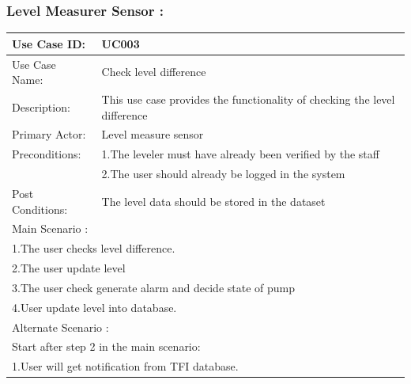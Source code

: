 	\subsubsection{Level Measurer Sensor :}
			\begin{center}
			\vspace*{1\baselineskip}	
			\begin{tabular}{|l|p{10cm}|}
				\hline
				Use Case ID: & UC003 \\
				\hline
				Use Case Name: & Check level difference \\
				\hline
				Description: & This use case provides the functionality of checking the level difference \\
				\hline
				Primary Actor: & Level measure sensor \\
				\hline
				Preconditions: & 1.The leveler must have already been verified by the staff\\ 
				& 2.The user should already be logged in the system \\
				\hline
				Post Conditions: & The level data should be stored in the dataset\\
				\hline
				\multicolumn{2}{|l|}{Main Scenario :} \\
				\hline
				\multicolumn{2}{|l|}{1.The user checks level difference.} \\
				\multicolumn{2}{|l|}{2.The user update level} \\
				\multicolumn{2}{|l|}{3.The user check generate alarm and decide state of pump} \\
				\multicolumn{2}{|l|}{4.User update level into database.} \\
				\hline
				\multicolumn{2}{|l|}{Alternate Scenario :} \\
				\hline
				\multicolumn{2}{|l|}{Start after step 2 in the main scenario:} \\
				\multicolumn{2}{|l|}{1.User will get notification from TFI database.} \\
				\hline
			\end{tabular}
			\end{center}
			
			
			
